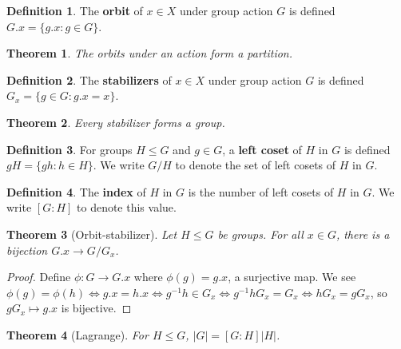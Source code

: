 \documentclass[
    parskip=half,
    toc=flat,
    toc=sectionentrydotfill,
]{scrartcl}  %
\theoremstyle{definition}
\newtheorem{definition}{Definition}[section]
\theoremstyle{plain}
\newtheorem{theorem}{Theorem}[section]
\theoremstyle{remark}
\begin{document}
\begin{definition}
    The \textbf{orbit} of $x\in X$ under group action $G$ is defined
    $G.x=\{g.x:g\in G\}$.
\end{definition}

\begin{theorem}
    The orbits under an action form a partition.
\end{theorem}


\begin{definition}
    The \textbf{stabilizers} of $x\in X$ under group action $G$ is defined
    $G_x=\{g\in G:g.x=x\}$.
\end{definition}

\begin{theorem}
    \label{thm:stabilizers are groups}
    Every stabilizer forms a group.
\end{theorem}

\begin{definition}
    For groups $H\leq G$ and $g\in G$, a \textbf{left coset} of $H$ in $G$ is
    defined $gH=\{gh:h\in H\}$.
    We write $G/H$ to denote the set of left cosets of $H$ in $G$.
\end{definition}

\begin{definition}
    The \textbf{index} of $H$ in $G$ is the number of left cosets of $H$ in
    $G$.
    We write $[G:H]$ to denote this value.
\end{definition}

\begin{theorem}[Orbit-stabilizer]
    Let $H\leq G$ be groups.
    For all $x\in G$, there is a bijection $G.x\to G/G_x$.
\end{theorem}

\begin{proof}
    Define $\phi:G\to G.x$ where $\phi(g)=g.x$, a surjective map.
    We see $\phi(g)=\phi(h)\iff g.x=h.x\iff g^{-1}h\in G_x\iff
    g^{-1}hG_x=G_x\iff hG_x=gG_x$, so $gG_x\mapsto g.x$ is bijective.
\end{proof}

\begin{theorem}[Lagrange]
    For $H\leq G$, $|G|=[G:H]|H|$.
\end{theorem}
\end{document}
